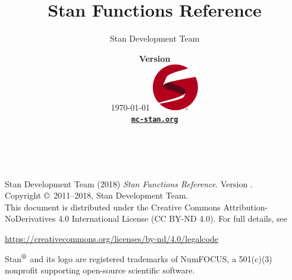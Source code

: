 \title{\Huge\bf Stan Functions Reference\vspace*{-12pt}}
\author{\vspace*{-12pt}\Large Stan Development Team}

\date{\vspace*{24pt}
{\large\bfseries Version \stanversion}
\\[6pt] 
{\small \today}
\vfill
\includegraphics[width=0.8in]{img/logo-tm.pdf}
\\[-2pt]
{\small\bfseries \href{http://mc-stan.org/}{\tt mc-stan.org}}
}
\maketitle

\newpage
\thispagestyle{empty}
\mbox{ }
\vfill
\begin{center}
\begin{minipage}[t]{0.75\textwidth}
\small
Stan Development Team (2018)
{\it Stan Functions Reference}. Version
\stanversion.
\vspace*{20pt}
\mbox{ }
\\
Copyright \copyright \ 2011--2018, Stan Development Team.
\vspace*{28pt}
\mbox{} \\
This document is distributed under the Creative Commons
Attribution-NoDerivatives 4.0 International License (CC BY-ND 4.0).
For full details, see
\begin{center}
\url{https://creativecommons.org/licenses/by-nd/4.0/legalcode}
\end{center}
Stan\hspace*{-1pt}$^{\mbox{\footnotesize\vspace*{-1.5pt}\textregistered}}$ and its logo are
registered trademarks of NumFOCUS, a 501(c)(3) nonprofit supporting
open-source scientific software.
\end{minipage}
\vspace*{24pt}
\mbox{ }
\end{center}
